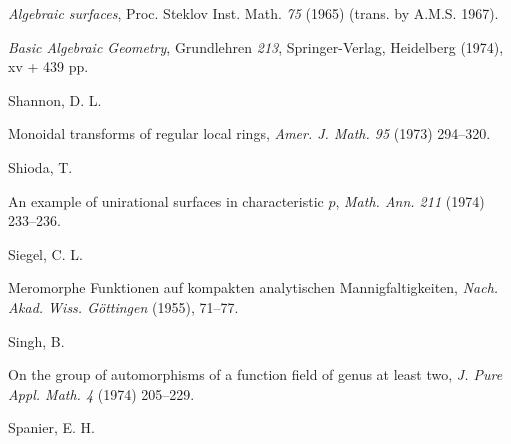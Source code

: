 {\emph{Algebraic surfaces}, Proc. Steklov Inst. Math. \emph{75} (1965) (trans. by A.M.S. 1967).\par
\noindent\hangindent=25bp\hspace*{6bp}%
\emph{Basic Algebraic Geometry}, Grundlehren \emph{213}, Springer-Verlag, Heidelberg (1974), xv + 439 pp.\par
\par\vspace{2.15pt}\noindent \hypertarget{bib-482-8}{}Shannon, D. L.\par
\noindent\hangindent=25bp\hspace*{6bp}%
Monoidal transforms of regular local rings, \emph{Amer. J. Math. 95} (1973) 294--320.\par
\par\vspace{2.15pt}\noindent \hypertarget{bib-482-9}{}Shioda, T.\par
\noindent\hangindent=25bp\hspace*{6bp}%
An example of unirational surfaces in characteristic $p$, \emph{Math. Ann. 211} (1974) 233--236.\par
\par\vspace{2.15pt}\noindent Siegel, C. L.\par
\noindent\hangindent=25bp\hspace*{6bp}%
Meromorphe Funktionen auf kompakten analytischen Mannigfaltigkeiten, \emph{Nach. Akad. Wiss. G\"ottingen} (1955), 71--77.\par
\par\vspace{2.15pt}\noindent \hypertarget{bib-482-10}{}Singh, B.\par
\noindent\hangindent=25bp\hspace*{6bp}%
On the group of automorphisms of a function field of genus at least two, \emph{J. Pure Appl. Math. 4} (1974) 205--229.\par
\par\vspace{2.15pt}\noindent \hypertarget{bib-482-11}{}Spanier, E. H.\par
\noindent\hangindent=25bp\hspace*{6bp}%
}
